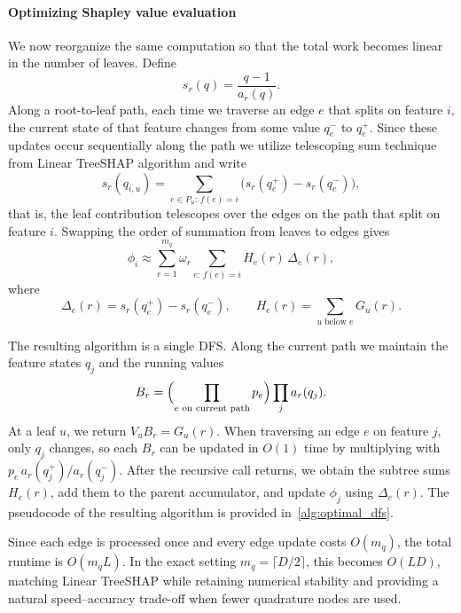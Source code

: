 \documentclass{article}
\begin{document}
\paragraph{Optimizing Shapley value evaluation}
We now reorganize the same computation so that the total work becomes linear in the number of leaves. Define
\[
s_r(q)=\frac{q-1}{a_r(q)}.
\]
Along a root-to-leaf path, each time we traverse an edge $e$ that splits on feature $i$, the current state of that feature changes from some value $q_e^{-}$ to $q_e^{+}$. Since these updates occur sequentially along the path we utilize telescoping sum technique from Linear TreeSHAP algorithm and write
\[
s_r(q_{i,u})=\sum_{e\in P_u:\, f(e)=i} \bigl(s_r(q_e^{+})-s_r(q_e^{-})\bigr),
\]
that is, the leaf contribution telescopes over the edges on the path that split on feature $i$. Swapping the order of summation from leaves to edges gives
\[
\phi_i \approx \sum_{r=1}^{m_q}\omega_r \sum_{e:\, f(e)=i} H_e(r)\,\Delta_e(r),
\]
where
\[
\Delta_e(r)=s_r(q_e^{+})-s_r(q_e^{-}),
\qquad
H_e(r)=\sum_{u \text{ below } e} G_u(r).
\]

The resulting algorithm is a single DFS. Along the current path we maintain the feature states $q_j$ and the running values
\[
B_r=\Bigl(\prod_{e \text{ on current path}} p_e\Bigr)\prod_j a_r(q_j).
\]
At a leaf $u$, we return $V_u B_r = G_u(r)$. When traversing an edge $e$ on feature $j$, only $q_j$ changes, so each $B_r$ can be updated in $O(1)$ time by multiplying with $p_e\, a_r(q_j^{+})/a_r(q_j^{-})$. After the recursive call returns, we obtain the subtree sums $H_e(r)$, add them to the parent accumulator, and update $\phi_j$ using $\Delta_e(r)$. The pseudocode of the resulting algorithm is provided in~\ref{alg:optimal_dfs}.

Since each edge is processed once and every edge update costs $O(m_q)$, the total runtime is $O(m_qL)$. In the exact setting $m_q=\lceil D/2\rceil$, this becomes $O(LD)$, matching Linear TreeSHAP while retaining numerical stability and providing a natural speed--accuracy trade-off when fewer quadrature nodes are used.


\end{document}
